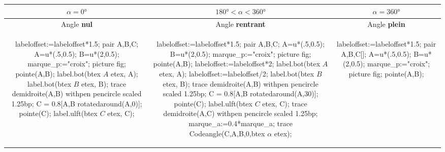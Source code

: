 \begin{changemargin}{0mm}{-20mm}
\begin{definition}[Classement des angles selon leur mesure $\alpha=\widehat{BAC}$]
\begin{center}
        \smallskip
        {\renewcommand{\arraystretch}{1.5}
        \begin{tabular}{|*3{c|}}
            \hline
            $\alpha=\ang{0}$ & $\ang{180}<\alpha<\ang{360}$ & $\alpha=\ang{360}$ \\\hline
            Angle \textbf{nul} & Angle \textbf{rentrant} & Angle \textbf{plein} \\\hline
            \begin{Geometrie}[CoinHD={(2.5u,2u)}]            
                labeloffset:=labeloffset*1.5;
                pair A,B,C;
                A=u*(.5,0.5);
                B=u*(2,0.5);
                marque_p:="croix";
                picture fig;
                pointe(A,B);
                label.bot(btex $A$ etex, A);
                label.bot(btex $B$ etex, B);
                trace demidroite(A,B) withpen pencircle scaled 1.25bp;
                C = 0.8[A,B rotatedaround(A,0)];
                pointe(C);
                label.ulft(btex $C$ etex, C);
            \end{Geometrie}
            &
            \begin{Geometrie}[CoinBG={(-u,-0.5u)},CoinHD={(2.5u,1.5u)}]
                labeloffset:=labeloffset*1.5;
                pair A,B,C;
                A=u*(.5,0.5);
                B=u*(2,0.5);
                marque_p:="croix";
                picture fig;
                pointe(A,B);
                labeloffset:=labeloffset*2;
                label.bot(btex $A$ etex, A);
                labeloffset:=labeloffset/2;
                label.bot(btex $B$ etex, B);
                trace demidroite(A,B) withpen pencircle scaled 1.25bp;
                C = 0.8[A,B rotatedaround(A,30)];
                pointe(C);
                label.ulft(btex $C$ etex, C);
                trace demidroite(A,C) withpen pencircle scaled 1.25bp;
                marque_a:=0.4*marque_a;
                trace Codeangle(C,A,B,0,btex $\alpha$ etex);
            \end{Geometrie}
            &
            \begin{Geometrie}[CoinBG={(-u,-0.5u)},CoinHD={(2.5u,1.5u)}]            
                labeloffset:=labeloffset*1.5;
                pair A,B,C[];
                A=u*(.5,0.5);
                B=u*(2,0.5);
                marque_p:="croix";
                picture fig;
                pointe(A,B);

\end{Geometrie}
\end{tabular}}
\end{center}
\end{definition}
\end{changemargin}
